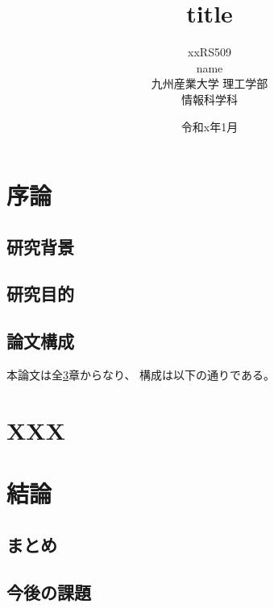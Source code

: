 \documentclass[a4paper,12pt]{ujreport}
\title{
 \Huge{title}
 \vspace{3.5cm}\\
}
\author{
 \LARGE{xxRS509}\vspace{0.5cm}\\
 \LARGE{name}\vspace{2cm}\\
 \LARGE{九州産業大学 理工学部}\vspace{0.5cm}\\
 \LARGE{情報科学科}\vspace{1cm}\\
}
\date{\LARGE{令和x年1月}}
\begin{document}
\maketitle
\setcounter{page}{0}
\tableofcontents
\listoffigures
\listoftables
\clearpage
\setcounter{page}{0}


\chapter{序論}\label{chap:joron}

\section{研究背景}\label{sec:haikei}
    
\section{研究目的}\label{sec:mokuteki}

\section{論文構成}\label{sec:kousei}

本論文は全\ref{chap:keturon}章からなり、
構成は以下の通りである。


\chapter{XXX}\label{chap:xxx}


\chapter{結論}\label{chap:keturon}

\section{まとめ}\label{sec:matome}
 
\section{今後の課題}\label{sec:kadai}
\end{document}
